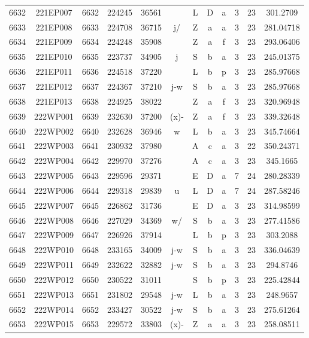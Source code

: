 \begin{tabular}{|*{12}{c|}}
6632 & 221EP007 & 6632 & 224245 & 36561 &  & L & D & a & 3 & 23 & 301.2709 \\ 
6633 & 221EP008 & 6633 & 224708 & 36715 & j/ & Z & a & a & 3 & 23 & 281.04718 \\ 
6634 & 221EP009 & 6634 & 224248 & 35908 &  & Z & a & f & 3 & 23 & 293.06406 \\ 
6635 & 221EP010 & 6635 & 223737 & 34905 & j & S & b & a & 3 & 23 & 245.01375 \\ 
6636 & 221EP011 & 6636 & 224518 & 37220 &  & L & b & p & 3 & 23 & 285.97668 \\ 
6637 & 221EP012 & 6637 & 224367 & 37210 & j-w & S & b & a & 3 & 23 & 285.97668 \\ 
6638 & 221EP013 & 6638 & 224925 & 38022 &  & Z & a & f & 3 & 23 & 320.96948 \\ 
6639 & 222WP001 & 6639 & 232630 & 37200 & (x)- & Z & a & f & 3 & 23 & 339.32648 \\ 
6640 & 222WP002 & 6640 & 232628 & 36946 & w & L & b & a & 3 & 23 & 345.74664 \\ 
6641 & 222WP003 & 6641 & 230932 & 37980 &  & A & c & a & 3 & 22 & 350.24371 \\ 
6642 & 222WP004 & 6642 & 229970 & 37276 &  & A & c & a & 3 & 23 & 345.1665 \\ 
6643 & 222WP005 & 6643 & 229596 & 29371 &  & E & D & a & 7 & 24 & 280.28339 \\ 
6644 & 222WP006 & 6644 & 229318 & 29839 & u & L & D & a & 7 & 24 & 287.58246 \\ 
6645 & 222WP007 & 6645 & 226862 & 31736 &  & E & D & a & 3 & 23 & 314.98599 \\ 
6646 & 222WP008 & 6646 & 227029 & 34369 & w/ & S & b & a & 3 & 23 & 277.41586 \\ 
6647 & 222WP009 & 6647 & 226926 & 37914 &  & L & b & p & 3 & 23 & 303.2088 \\ 
6648 & 222WP010 & 6648 & 233165 & 34009 & j-w & S & b & a & 3 & 23 & 336.04639 \\ 
6649 & 222WP011 & 6649 & 232622 & 32882 & j-w & S & b & a & 3 & 23 & 294.8746 \\ 
6650 & 222WP012 & 6650 & 230522 & 31011 &  & S & b & p & 3 & 23 & 225.42844 \\ 
6651 & 222WP013 & 6651 & 231802 & 29548 & j-w & L & b & a & 3 & 23 & 248.9657 \\ 
6652 & 222WP014 & 6652 & 233427 & 30522 & j-w & S & b & a & 3 & 23 & 275.61264 \\ 
6653 & 222WP015 & 6653 & 229572 & 33803 & (x)- & Z & a & a & 3 & 23 & 258.08511 \\ 

\end{tabular}
